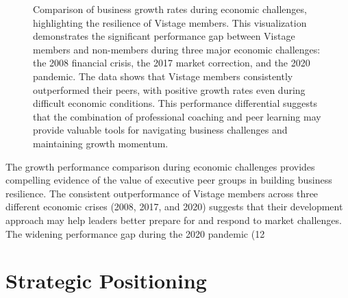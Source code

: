 \documentclass[conference]{IEEEtran}
\begin{document}
\begin{figure}[t]
\centering
{}
\caption{Comparison of business growth rates during economic challenges, highlighting the resilience of Vistage members. This visualization demonstrates the significant performance gap between Vistage members and non-members during three major economic challenges: the 2008 financial crisis, the 2017 market correction, and the 2020 pandemic. The data shows that Vistage members consistently outperformed their peers, with positive growth rates even during difficult economic conditions. This performance differential suggests that the combination of professional coaching and peer learning may provide valuable tools for navigating business challenges and maintaining growth momentum.}
\label{fig:growth_comparison}
\end{figure}

The growth performance comparison during economic challenges provides compelling evidence of the value of executive peer groups in building business resilience. The consistent outperformance of Vistage members across three different economic crises (2008, 2017, and 2020) suggests that their development approach may help leaders better prepare for and respond to market challenges. The widening performance gap during the 2020 pandemic (12%

\section{Strategic Positioning}
\end{document}
